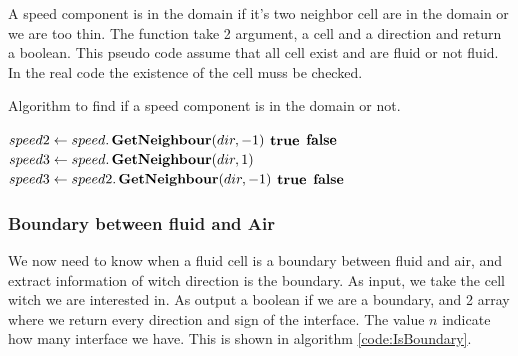 A speed component is in the domain if it's two neighbor cell are in the domain or we are too thin.
The function take 2 argument, a cell and a direction and return a boolean.
This pseudo code assume that all cell exist and are fluid or not fluid.
In the real code the existence of the cell muss be checked.

\begin{algorithm}
\caption{Algorithm to find if a speed component is in the domain or not.}\label{euclid}
\begin{algorithmic}[1]
\State $speed2\gets speed.\mathop{\textbf{GetNeighbour}}(dir,-1)$
\State \Return $\mathop{\textbf{true}}$
\EndIf
{}
\State \Return $\mathop{\textbf{false}}$
\EndIf
\State {}
\State $speed3\gets speed.\mathop{\textbf{GetNeighbour}}(dir,1)$ 
\State $speed3\gets speed2.\mathop{\textbf{GetNeighbour}}(dir,-1)$
\EndIf
{}
\State \Return $\mathop{\textbf{true}}$
\EndIf
\State \Return $\mathop{\textbf{false}}$
\EndFunction
\end{algorithmic}
\end{algorithm}

\subsubsection{ Boundary between fluid and Air}

We now need to know when a fluid cell is a boundary between fluid and air, and extract information of witch direction is the boundary.
As input, we take the cell witch we are interested in.
As output a boolean if we are a boundary, and 2 array where we return every direction and sign of the interface.
The value $n$ indicate how many interface we have.
This is shown in algorithm \ref{code:IsBoundary}.

